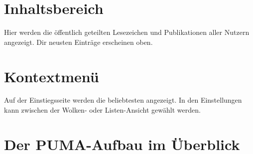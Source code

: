 \section{Inhaltsbereich}
\label{sec:inhaltsbereich}
Hier werden die öffentlich  geteilten Lesezeichen und Publikationen aller Nutzern angezeigt. Dir neusten Einträge erscheinen oben.
\section{Kontextmenü}
\label{sec:kontextmenue}
Auf der Einstiegsseite werden die beliebtesten \tags {} angezeigt. In den Einstellungen kann zwischen der Wolken- oder Listen-Ansicht gewählt werden.
\newpage
\section{Der PUMA-Aufbau im Überblick}
\label{sec:pumaAufbau}

